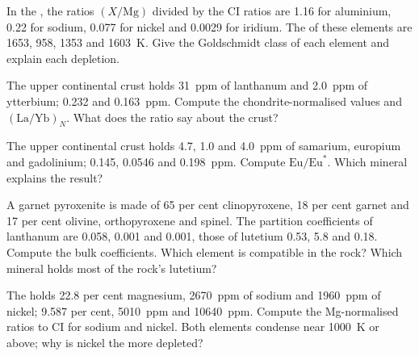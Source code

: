 \begin{exercise}[$\star$]\label{exo:b2:elements-in-the-earth:2}
In the , the ratios $(X/\mathrm{Mg})$ divided by the CI ratios
are 1.16 for aluminium, 0.22 for sodium, 0.077 for nickel and 0.0029 for
iridium. The  of these elements are 1653, 958, 1353
and \qty{1603}{K}. Give the Goldschmidt class of each element and explain each
depletion.
\end{exercise}

\begin{exercise}[$\star$]\label{exo:b2:elements-in-the-earth:3}
The upper continental crust holds \qty{31}{ppm} of lanthanum and \qty{2.0}{ppm}
of ytterbium;  0.232 and \qty{0.163}{ppm}. Compute the
chondrite-normalised values and $(\mathrm{La}/\mathrm{Yb})_N$. What does the
ratio say about the crust?
\end{exercise}

\begin{exercise}[$\star$]\label{exo:b2:elements-in-the-earth:4}
The upper continental crust holds 4.7, 1.0 and \qty{4.0}{ppm} of samarium,
europium and gadolinium;  0.145, 0.0546 and \qty{0.198}{ppm}.
Compute $\mathrm{Eu}/\mathrm{Eu}^*$. Which mineral explains the result?
\end{exercise}

\begin{exercise}[$\star\star$]\label{exo:b2:elements-in-the-earth:5}
A garnet pyroxenite is made of 65 per cent clinopyroxene, 18 per cent garnet and
17 per cent olivine, orthopyroxene and spinel. The partition coefficients of
lanthanum are 0.058, 0.001 and 0.001, those of lutetium 0.53, 5.8 and 0.18.
Compute the bulk coefficients. Which element is compatible in the rock? Which
mineral holds most of the rock's lutetium?
\end{exercise}

\begin{exercise}[$\star\star$]\label{exo:b2:elements-in-the-earth:6}
The  holds 22.8 per cent magnesium, \qty{2670}{ppm} of
sodium and \qty{1960}{ppm} of nickel;  9.587 per cent,
\qty{5010}{ppm} and \qty{10640}{ppm}. Compute the Mg-normalised ratios to CI for
sodium and nickel. Both elements condense near \qty{1000}{K} or above; why is
nickel the more depleted?
\end{exercise}

